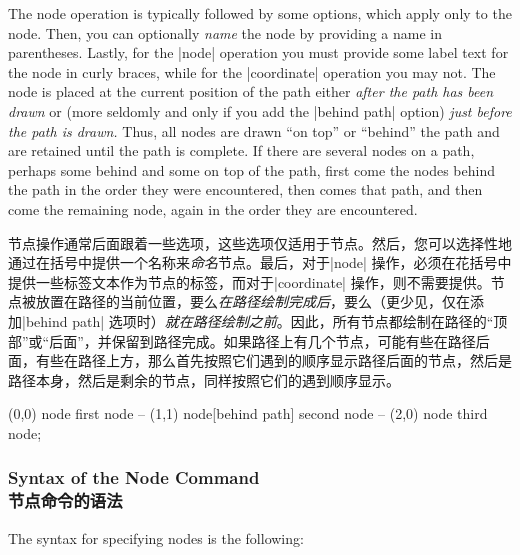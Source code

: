 The node operation is typically followed by some options, which apply only to
the node. Then, you can optionally \emph{name} the node by providing a name in
parentheses. Lastly, for the |node| operation you must provide some label text
for the node in curly braces, while for the |coordinate| operation you may not.
The node is placed at the current position of the path either \emph{after the
path has been drawn} or (more seldomly and only if you add the |behind path|
option) \emph{just before the path is drawn.} Thus, all nodes are drawn ``on
top'' or ``behind'' the path and are retained until the path is complete. If
there are several nodes on a path, perhaps some behind and some on top of the
path, first come the nodes behind the path in the order they were encountered,
then comes that path, and then come the remaining node, again in the order they
are encountered.
%

节点操作通常后面跟着一些选项，这些选项仅适用于节点。然后，您可以选择性地通过在括号中提供一个名称来\emph{命名}节点。最后，对于|node| 操作，必须在花括号中提供一些标签文本作为节点的标签，而对于|coordinate| 操作，则不需要提供。节点被放置在路径的当前位置，要么\emph{在路径绘制完成后}，要么（更少见，仅在添加|behind path| 选项时）\emph{就在路径绘制之前}。因此，所有节点都绘制在路径的“顶部”或“后面”，并保留到路径完成。如果路径上有几个节点，可能有些在路径后面，有些在路径上方，那么首先按照它们遇到的顺序显示路径后面的节点，然后是路径本身，然后是剩余的节点，同样按照它们的遇到顺序显示。

\begin{codeexample}[]
\tikz \fill [fill=yellow!80!black]
     (0,0) node              {first node}
  -- (1,1) node[behind path] {second node}
  -- (2,0) node              {third node};
\end{codeexample}


\subsubsection{Syntax of the Node Command\\节点命令的语法}

The syntax for specifying nodes is the following:
%

